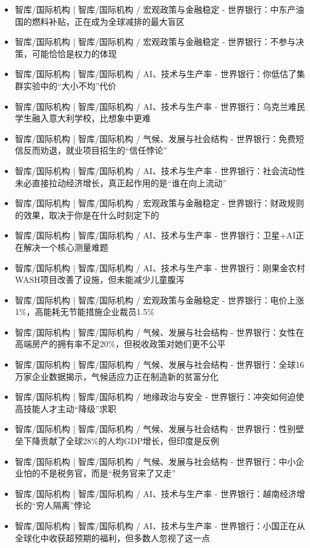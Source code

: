 \documentclass[11pt]{ctexart}
\begin{document}
\begin{itemize}
  \item [R016] 智库/国际机构 | 智库/国际机构 / 宏观政策与金融稳定 - 世界银行：中东产油国的燃料补贴，正在成为全球减排的最大盲区
  \item [R017] 智库/国际机构 | 智库/国际机构 / 宏观政策与金融稳定 - 世界银行：不参与决策，可能恰恰是权力的体现
  \item [R018] 智库/国际机构 | 智库/国际机构 / AI、技术与生产率 - 世界银行：你低估了集群实验中的“大小不均”代价
  \item [R019] 智库/国际机构 | 智库/国际机构 / AI、技术与生产率 - 世界银行：乌克兰难民学生融入意大利学校，比想象中更难
  \item [R020] 智库/国际机构 | 智库/国际机构 / 气候、发展与社会结构 - 世界银行：免费短信反而劝退，就业项目招生的“信任悖论”
  \item [R021] 智库/国际机构 | 智库/国际机构 / AI、技术与生产率 - 世界银行：社会流动性未必直接拉动经济增长，真正起作用的是“谁在向上流动”
  \item [R022] 智库/国际机构 | 智库/国际机构 / 宏观政策与金融稳定 - 世界银行：财政规则的效果，取决于你是在什么时刻定下的
  \item [R023] 智库/国际机构 | 智库/国际机构 / AI、技术与生产率 - 世界银行：卫星+AI正在解决一个核心测量难题
  \item [R024] 智库/国际机构 | 智库/国际机构 / AI、技术与生产率 - 世界银行：刚果金农村WASH项目改善了设施，但未能减少儿童腹泻
  \item [R025] 智库/国际机构 | 智库/国际机构 / 宏观政策与金融稳定 - 世界银行：电价上涨1\%，高能耗无节能措施企业裁员1.5\%
  \item [R026] 智库/国际机构 | 智库/国际机构 / 气候、发展与社会结构 - 世界银行：女性在高端房产的拥有率不足20\%，但税收政策对她们更不公平
  \item [R027] 智库/国际机构 | 智库/国际机构 / 气候、发展与社会结构 - 世界银行：全球16万家企业数据揭示，气候适应力正在制造新的贫富分化
  \item [R028] 智库/国际机构 | 智库/国际机构 / 地缘政治与安全 - 世界银行：冲突如何迫使高技能人才主动“降级”求职
  \item [R029] 智库/国际机构 | 智库/国际机构 / 气候、发展与社会结构 - 世界银行：性别壁垒下降贡献了全球28\%的人均GDP增长，但印度是反例
  \item [R030] 智库/国际机构 | 智库/国际机构 / 气候、发展与社会结构 - 世界银行：中小企业怕的不是税务官，而是“税务官来了又走”
  \item [R031] 智库/国际机构 | 智库/国际机构 / AI、技术与生产率 - 世界银行：越南经济增长的“穷人隔离”悖论
  \item [R032] 智库/国际机构 | 智库/国际机构 / AI、技术与生产率 - 世界银行：小国正在从全球化中收获超预期的福利，但多数人忽视了这一点

\end{itemize}
\end{document}
